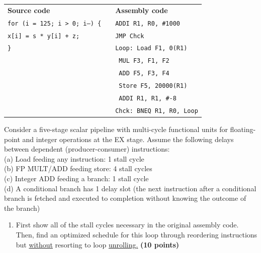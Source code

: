\documentclass[a4paper, 11pt]{exam}
\begin{document}
\begin{enumerate}
\begin{tabular}{lll}
	\textbf{Source code} & & \textbf{Assembly code }\\
	\texttt{for (i = 125; i > 0; i--) \{}&  &\hspace{40pt}\texttt{ADDI R1, R0, \#1000} \\
	\hspace{20pt}\texttt{x[i] = s * y[i] + z;} &  &\hspace{40pt}\texttt{JMP Chck}\\
	\texttt{\}} &  &\texttt{Loop: Load F1, 0(R1)} \\
    &  &\hspace{35pt}\texttt{ MUL F3, F1, F2}\\
	&  &\hspace{35pt}\texttt{ ADD F5, F3, F4}\\
	&  &\hspace{35pt}\texttt{ Store F5, 20000(R1)}\\
	&  &\hspace{35pt}\texttt{ ADDI R1, R1, \#-8}\\
	&  &\texttt{Chck: BNEQ R1, R0, Loop}\\
\end{tabular}

Consider a five-stage scalar pipeline with multi-cycle functional units for floating-point and integer operations at the EX stage.
Assume the following delays between dependent (producer-consumer) instructions:\\
(a) Load feeding any instruction: 1 stall cycle\\
(b) FP MULT/ADD feeding store: 4 stall cycles\\
(c) Integer ADD feeding a branch: 1 stall cycle\\
(d) A conditional branch has 1 delay slot (the next instruction after a conditional branch is fetched and executed to completion without knowing the outcome of the branch)

\begin{enumerate}
	\item First show all of the stall cycles necessary in the original assembly code. Then, find an optimized schedule for this loop through reordering instructions but \underline{without} resorting to loop \underline{unrolling.} \textbf{(10 points)}
	

\end{enumerate}
\end{enumerate}
\end{document}
